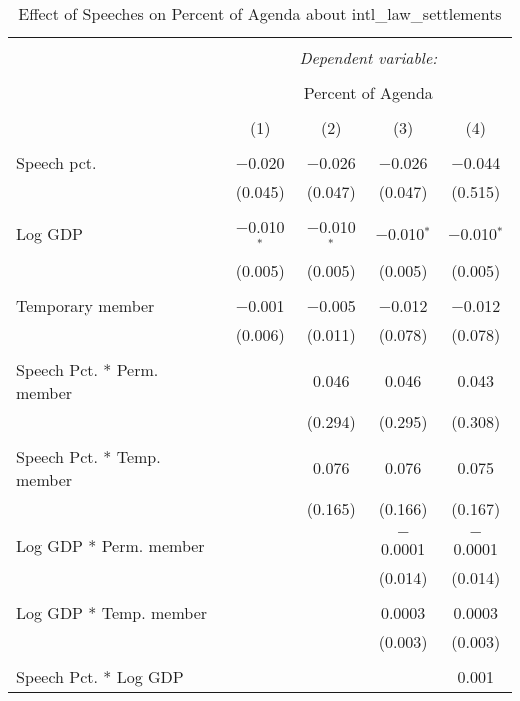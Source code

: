 
\begin{table}[!htbp] \centering 
  \caption{Effect of Speeches on Percent of Agenda about  intl_law_settlements} 
  \label{} 
\begin{tabular}{@{\extracolsep{5pt}}lcccc} 
\\[-1.8ex]\hline 
\hline \\[-1.8ex] 
 & \multicolumn{4}{c}{\textit{Dependent variable:}} \\ 
\cline{2-5} 
\\[-1.8ex] & \multicolumn{4}{c}{Percent of Agenda} \\ 
\\[-1.8ex] & (1) & (2) & (3) & (4)\\ 
\hline \\[-1.8ex] 
 Speech pct. & $-$0.020 & $-$0.026 & $-$0.026 & $-$0.044 \\ 
  & (0.045) & (0.047) & (0.047) & (0.515) \\ 
  & & & & \\ 
 Log GDP & $-$0.010$^{*}$ & $-$0.010$^{*}$ & $-$0.010$^{*}$ & $-$0.010$^{*}$ \\ 
  & (0.005) & (0.005) & (0.005) & (0.005) \\ 
  & & & & \\ 
 Temporary member & $-$0.001 & $-$0.005 & $-$0.012 & $-$0.012 \\ 
  & (0.006) & (0.011) & (0.078) & (0.078) \\ 
  & & & & \\ 
 Speech Pct. * Perm. member &  & 0.046 & 0.046 & 0.043 \\ 
  &  & (0.294) & (0.295) & (0.308) \\ 
  & & & & \\ 
 Speech Pct. * Temp. member &  & 0.076 & 0.076 & 0.075 \\ 
  &  & (0.165) & (0.166) & (0.167) \\ 
  & & & & \\ 
 Log GDP * Perm. member &  &  & $-$0.0001 & $-$0.0001 \\ 
  &  &  & (0.014) & (0.014) \\ 
  & & & & \\ 
 Log GDP * Temp. member &  &  & 0.0003 & 0.0003 \\ 
  &  &  & (0.003) & (0.003) \\ 
  & & & & \\ 
 Speech Pct. * Log GDP &  &  &  & 0.001 \\ 

\end{tabular}
\end{table}
